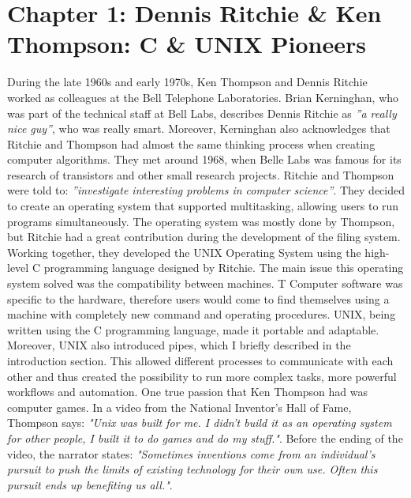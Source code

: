 \documentclass[12pt]{article}
\begin{document}
\section{Chapter 1: Dennis Ritchie \& Ken Thompson: C \& UNIX Pioneers}
During the late 1960s and early 1970s, Ken Thompson and Dennis Ritchie worked as colleagues at the Bell Telephone Laboratories. Brian Kerninghan, who was part of the technical staff at Bell Labs, describes Dennis Ritchie as \textit{”a really nice guy”}, who was really smart. Moreover, Kerninghan also acknowledges that Ritchie and Thompson had almost the same thinking process when creating computer algorithms. They met around 1968, when Belle Labs was famous for its research of transistors and other small research projects. Ritchie and Thompson were told to: \textit{”investigate interesting problems in computer science”}.
\newline\newline
They decided to create an operating system that  supported  multitasking,  allowing users to run programs simultaneously. The operating system was mostly done by Thompson, but Ritchie had a great contribution during the development of the filing system.\newline\newline
Working together, they developed the UNIX Operating System using the high-level C programming language designed by Ritchie. The main issue this operating system solved was the compatibility between machines. T Computer software was specific to the hardware, therefore users would come to find themselves using a machine with completely new command and operating procedures.  UNIX, being written using the C programming language, made it portable and adaptable. Moreover, UNIX also introduced pipes, which I briefly described in the introduction section. This allowed different processes to communicate with each other and thus created the possibility to run more complex tasks, more powerful workflows and automation. \newline\newline
One true passion that Ken Thompson had was computer games. In a video from the National Inventor’s Hall of Fame, Thompson says: \textit{"Unix was built for me. I didn't build it as an operating system for other people, I built it to do games and do my stuff."}. Before the ending of the video, the narrator states: \textit{"Sometimes inventions come from an individual's pursuit to push the limits of existing technology for their own use. Often this pursuit ends up benefiting us all."}.\newline\newline
\end{document}
